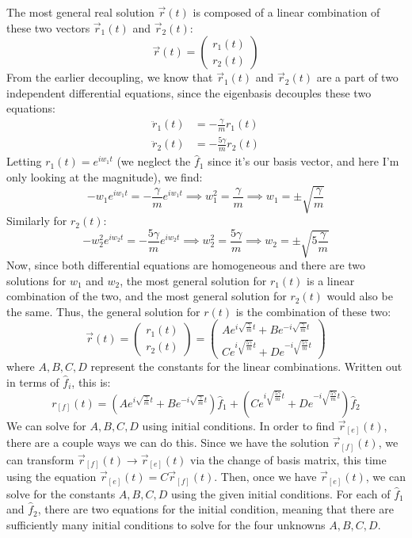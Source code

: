\documentclass[10pt]{article}
\begin{document}
\begin{enumerate}[label=\alph*)]
		\begin{solution}
			The most general real solution $\vec r(t)$ is composed of a linear combination of these two 
			vectors $\vec r_1(t)$ and $\vec r_2(t)$:
			\[
			\vec r(t) = \begin{pmatrix} r_1(t) \\ r_2(t) \end{pmatrix} 
			\] 
			From the earlier decoupling, we know that $\vec r_1(t)$ and $\vec r_2(t)$ are a part of two 
			independent differential equations, since the eigenbasis decouples these two equations:
			\begin{align*}
				\ddot r_1(t) &= -\frac{\gamma}{m}r_1(t) \\
				\ddot r_2(t) &= -\frac{5\gamma}{m}r_2(t)
			\end{align*}
			Letting $r_1(t) = e^{i w_1 t}$ (we neglect the $\hat{f}_1$ since it's our basis vector, and 
			here I'm only looking at the magnitude), we find:
			\[
				-w_1e^{i w_1t} = -\frac{\gamma}{m}e^{i w_1t} \implies w_1^2 = \frac{\gamma}{m} \implies 
				w_1 = \pm \sqrt{\frac{\gamma}{m}} 
			\] 
			Similarly for $r_2(t)$:
			\[
				-w_2^2 e^{i w_2t} = -\frac{5\gamma}{m}e^{iw_2t} \implies w_2^2 = \frac{5\gamma}{m} \implies
				w_2 = \pm \sqrt{5 \frac{\gamma}{m}} 
			\] 
			Now, since both differential equations are homogeneous and there are two solutions for $w_1$ and 
			$w_2$, the most general solution for $r_1(t)$ is a linear combination of the two, and the most 
			general solution for $r_2(t)$ would also be the same. Thus, the general solution for $r(t)$ is 
			the combination of these two:
			\[
			\vec r(t) = \begin{pmatrix} r_1(t) \\ r_2(t) \end{pmatrix} = \begin{pmatrix} 
		Ae^{i \sqrt{\frac{\gamma}{m}} t} + Be^{-i \sqrt{\frac{\gamma}{m}} t} \\
	Ce^{i\sqrt{\frac{5\gamma}{m}} t} + De^{-i\sqrt{\frac{5\gamma}{m}} t}\end{pmatrix} 
			\] 
			where $A, B, C, D$ represent the constants for the linear combinations. Written out in terms of 
			$\hat{f}_i$, this is:
			\[
				r_{[f]}(t) = \left( Ae^{i \sqrt{\frac{\gamma}{m}} t} + Be^{-i\sqrt{\frac{\gamma}{m}}t }\right)
				\hat{f}_1 + \left( Ce^{i \sqrt{\frac{5\gamma}{m}} t} + D e^{-i \sqrt{\frac{5\gamma}{m}} t}\right)
				\hat{f}_2
			\] 
			We can solve for $A, B, C, D$ using initial conditions. In order to find $\vec r_{[e]}(t)$, 
			there are a couple ways we can do this. Since we have the solution $\vec r_{[f]}(t)$, we can 
			transform $\vec r_{[f]}(t) \to \vec r_{[e]}(t)$ via the change of basis matrix, this time using 
			the equation $\vec r_{[e]}(t) = C \vec r_{[f]}(t)$. Then, once we have $\vec r_{[e]}(t)$, we can 
			solve for the constants $A, B, C, D$ using the given initial conditions. For each of 
			$\hat{f}_1$ and $\hat{f}_2$, there are two equations for the initial condition, meaning that 
			there are sufficiently many initial conditions to solve for the four unknowns $A, B, C, D$.
		\end{solution}
	\end{enumerate}
	\pagebreak
\end{document}
